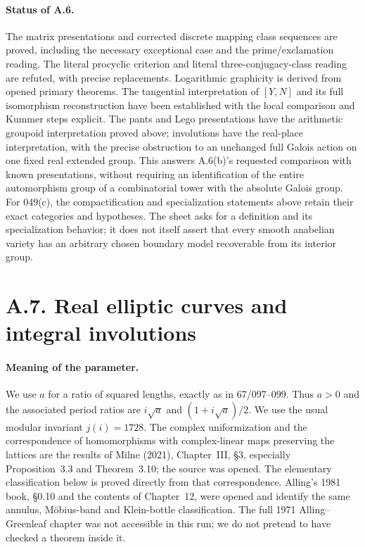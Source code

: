 \paragraph{Status of A.6.}
The matrix presentations and corrected discrete mapping class
sequences are proved, including the necessary exceptional case and
the prime/exclamation reading. The literal procyclic criterion
and literal three-conjugacy-class reading are refuted, with precise
replacements. Logarithmic graphicity is derived from opened primary
theorems. The tangential interpretation of $[Y,N]$ and its full isomorphism
reconstruction have been established with the local comparison and
Kummer steps explicit. The pants and Lego presentations have the arithmetic groupoid
interpretation proved above; involutions have the real-place
interpretation, with the precise obstruction to an unchanged
full Galois action on one fixed real extended group. This answers
A.6(b)'s requested comparison with known presentations, without
requiring an identification of the entire automorphism group of
a combinatorial tower with the absolute Galois group. For 049(c),
the compactification and specialization statements above retain
their exact categories and hypotheses. The sheet asks for a
definition and its specialization behavior; it does not itself
assert that every smooth anabelian variety has an arbitrary chosen
boundary model recoverable from its interior group.

\section{A.7. Real elliptic curves and integral involutions}

\paragraph{Meaning of the parameter.}
We use $a$ for a ratio of squared lengths, exactly as in 67/097--099.
Thus $a>0$ and the associated period ratios are
$i\sqrt a$ and $(1+i\sqrt a)/2$. We use the usual modular invariant
$j(i)=1728$. The complex uniformization and the correspondence of
homomorphisms with complex-linear maps preserving the lattices are
the results of Milne (2021), Chapter~III, \S3, especially
Proposition~3.3 and Theorem~3.10; the source was opened.
The elementary classification below is proved directly from that
correspondence. Alling's 1981 book, \S0.10 and the contents of
Chapter~12, were opened and identify the same annulus, M\"obius-band
and Klein-bottle classification. The full 1971 Alling--Greenleaf
chapter was not accessible in this run; we do not pretend to have
checked a theorem inside it.

